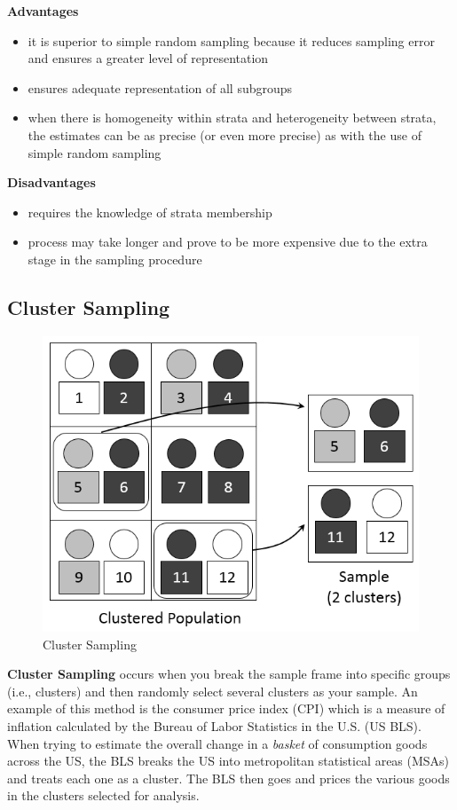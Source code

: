 \documentclass[
]{book}
\begin{document}
\textbf{Advantages}

\begin{itemize}
\item
  it is superior to simple random sampling because it reduces sampling error and ensures a greater level of representation
\item
  ensures adequate representation of all subgroups
\item
  when there is homogeneity within strata and heterogeneity between strata, the estimates can be as precise (or even more precise) as with the use of simple random sampling
\end{itemize}

\textbf{Disadvantages}

\begin{itemize}
\item
  requires the knowledge of strata membership
\item
  process may take longer and prove to be more expensive due to the extra stage in the sampling procedure
\end{itemize}

\subsection{Cluster Sampling}\label{cluster-sampling}

\begin{figure}

{\centering \includegraphics[width=0.5\linewidth]{images/Cluster} 

}

\caption{Cluster Sampling}\label{fig:unnamed-chunk-25}
\end{figure}

\textbf{Cluster Sampling} occurs when you break the sample frame into specific groups (i.e., clusters) and then randomly select several clusters as your sample. An example of this method is the consumer price index (CPI) which is a measure of inflation calculated by the Bureau of Labor Statistics in the U.S. (US BLS). When trying to estimate the overall change in a \emph{basket} of consumption goods across the US, the BLS breaks the US into metropolitan statistical areas (MSAs) and treats each one as a cluster. The BLS then goes and prices the various goods in the clusters selected for analysis.
\end{document}
